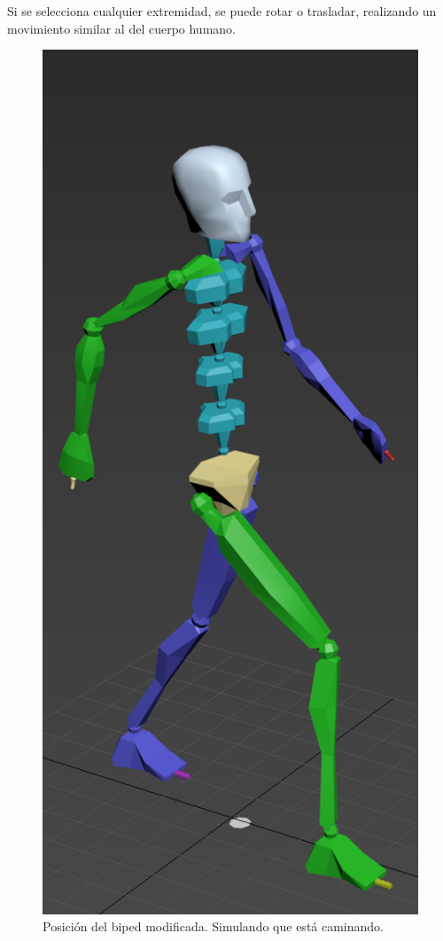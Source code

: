 \documentclass{article}
\begin{document}
Si se selecciona cualquier extremidad, se puede rotar o trasladar, realizando un movimiento similar al del cuerpo humano.

\begin{figure}[H]
   \centering
   \includegraphics[width=\textwidth]{imagenes/bipedWalk.png}
   \caption{Posición del biped modificada. Simulando que está caminando.}
\end{figure}
\end{document}
